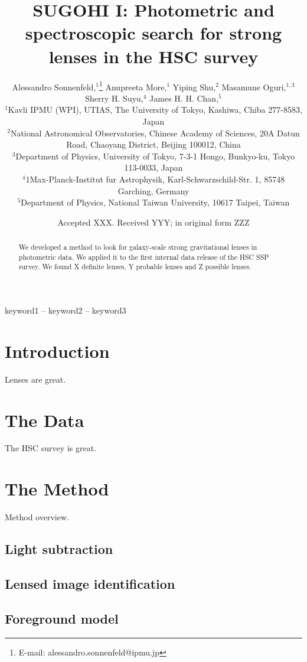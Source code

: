 \documentclass[a4paper,fleqn,usenatbib]{mnras}
\title[]{SUGOHI I: Photometric and spectroscopic search for strong lenses in the HSC survey}
\author[A. Sonnenfeld et al.]{
Alessandro Sonnenfeld,$^{1}$\thanks{E-mail: alessandro.sonnenfeld@ipmu.jp}
Anupreeta More,$^{1}$
Yiping Shu,$^{2}$
Masamune Oguri,$^{1,3}$
Sherry H. Suyu,$^{4}$
James H. H. Chan,$^{5}$
\\
$^{1}$Kavli IPMU (WPI), UTIAS, The University of Tokyo, Kashiwa, Chiba 277-8583, Japan \\
$^{2}$National Astronomical Observatories, Chinese Academy of
Sciences, 20A Datun Road, Chaoyang District, Beijing 100012,
China \\
$^{3}$Department of Physics, University of Tokyo, 7-3-1 Hongo, Bunkyo-ku, Tokyo 113-0033, Japan \\
$^{4}$1Max-Planck-Institut fur Astrophysik, Karl-Schwarzschild-Str. 1, 85748 Garching, Germany \\
$^{5}$Department of Physics, National Taiwan University, 10617 Taipei, Taiwan
}
\date{Accepted XXX. Received YYY; in original form ZZZ}
\begin{document}
\label{firstpage}
\pagerange{\pageref{firstpage}--\pageref{lastpage}}
\maketitle

\begin{abstract}
We developed a method to look for galaxy-scale strong gravitational lenses in photometric data. We applied it to the first internal data release of the HSC SSP survey. We found X definite lenses, Y probable lenses and Z possible lenses.
\end{abstract}

\begin{keywords}
keyword1 -- keyword2 -- keyword3
\end{keywords}



\section{Introduction}

Lenses are great.

\section{The Data}

The HSC survey is great.

\section{The Method}

Method overview.

\subsection{Light subtraction}

\subsection{Lensed image identification}

\subsection{Foreground model}
\end{document}
